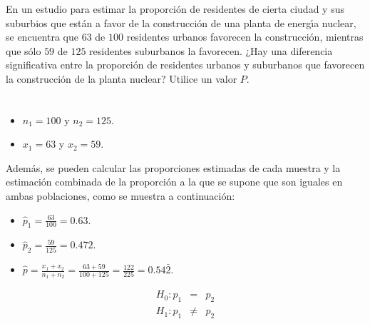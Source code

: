 \begin{enunciado}
 En un estudio para estimar la proporci\'on de residentes de cierta ciudad
 y sus suburbios que est\'an a favor de la construcci\'on de una planta
 de energ\'{\i}a nuclear,
 se encuentra que $63$ de $100$ residentes urbanos favorecen la construcci\'on,
 mientras que s\'olo $59$ de $125$ residentes suburbanos la favorecen.
 ¿Hay una diferencia significativa entre la proporci\'on de residentes urbanos
 y suburbanos que favorecen la construcci\'on de la planta nuclear?
 Utilice un valor $P$.
\end{enunciado}

\begin{solucion}
 \begin{datos}
  $\phantom{0}$
  \begin{itemize}
   \item $n_1 = 100$ y $n_2 = 125$.
   \item $x_1 = 63$ y $x_2 = 59$.
  \end{itemize}
  Adem\'as, se pueden calcular las proporciones estimadas de cada muestra
  y la estimaci\'on combinada de la proporci\'on a la que se supone que son iguales
  en ambas poblaciones, como se muestra a continuaci\'on:
  \begin{itemize}
   \item $\widehat{p}_1 = \frac{63}{100} = 0.63$.
   \item $\widehat{p}_2 = \frac{59}{125} = 0.472$.
   \item $\widehat{p} = \frac{x_1+x_2}{n_1+n_2} = \frac{63+59}{100+125}
   = \frac{122}{225} = 0.54\bar{2}$.
  \end{itemize}
 \end{datos}

 \begin{hipotesis}
  \begin{eqnarray*}
   H_0: p_1 &  =   & p_2 \\
   H_1: p_1 & \neq & p_2
  \end{eqnarray*}
 \end{hipotesis}


\end{solucion}
